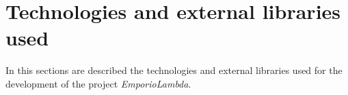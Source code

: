 \section{Technologies and external libraries used}
In this sections are described the technologies and external libraries used for the development of the project \textit{EmporioLambda}.

